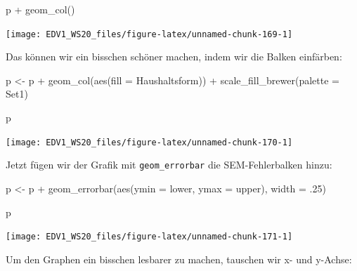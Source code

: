 \documentclass[
]{book}
\newenvironment{Shaded}{\begin{snugshade}}{\end{snugshade}}
\newcommand{\AttributeTok}[1]{\textcolor[rgb]{0.77,0.63,0.00}{#1}}
\newcommand{\DecValTok}[1]{\textcolor[rgb]{0.00,0.00,0.81}{#1}}
\newcommand{\FunctionTok}[1]{\textcolor[rgb]{0.00,0.00,0.00}{#1}}
\newcommand{\NormalTok}[1]{#1}
\newcommand{\OtherTok}[1]{\textcolor[rgb]{0.56,0.35,0.01}{#1}}
\newcommand{\SpecialCharTok}[1]{\textcolor[rgb]{0.00,0.00,0.00}{#1}}
\newcommand{\StringTok}[1]{\textcolor[rgb]{0.31,0.60,0.02}{#1}}
\begin{document}
\begin{Shaded}
\begin{Highlighting}[]
\NormalTok{p }\SpecialCharTok{+} \FunctionTok{geom\_col}\NormalTok{()}
\end{Highlighting}
\end{Shaded}

\begin{center}\texttt{[image: EDV1\_WS20\_files/figure-latex/unnamed-chunk-169-1]} \end{center}

Das können wir ein bisschen schöner machen, indem wir die Balken einfärben:

\begin{Shaded}
\begin{Highlighting}[]
\NormalTok{p }\OtherTok{\textless{}{-}}\NormalTok{ p }\SpecialCharTok{+} \FunctionTok{geom\_col}\NormalTok{(}\FunctionTok{aes}\NormalTok{(}\AttributeTok{fill =}\NormalTok{ Haushaltsform)) }\SpecialCharTok{+}
  \FunctionTok{scale\_fill\_brewer}\NormalTok{(}\AttributeTok{palette =} \StringTok{\textquotesingle{}Set1\textquotesingle{}}\NormalTok{)}

\NormalTok{p}
\end{Highlighting}
\end{Shaded}

\begin{center}\texttt{[image: EDV1\_WS20\_files/figure-latex/unnamed-chunk-170-1]} \end{center}

Jetzt fügen wir der Grafik mit \texttt{geom\_errorbar} die SEM-Fehlerbalken hinzu:

\begin{Shaded}
\begin{Highlighting}[]
\NormalTok{p }\OtherTok{\textless{}{-}}\NormalTok{ p }\SpecialCharTok{+} \FunctionTok{geom\_errorbar}\NormalTok{(}\FunctionTok{aes}\NormalTok{(}\AttributeTok{ymin =}\NormalTok{ lower, }
                      \AttributeTok{ymax =}\NormalTok{ upper),}
                  \AttributeTok{width =}\NormalTok{ .}\DecValTok{25}\NormalTok{)}

\NormalTok{p}
\end{Highlighting}
\end{Shaded}

\begin{center}\texttt{[image: EDV1\_WS20\_files/figure-latex/unnamed-chunk-171-1]} \end{center}

Um den Graphen ein bisschen lesbarer zu machen, tauschen wir x- und y-Achse:
\end{document}
